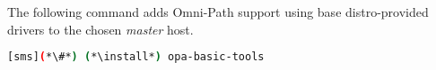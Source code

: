 The following command adds Omni-Path support using base distro-provided drivers
to the chosen {\em master} host.

\begin{lstlisting}[language=bash,keywords={}]
[sms](*\#*) (*\install*) opa-basic-tools
\end{lstlisting}



